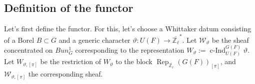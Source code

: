 \documentclass{article}
\newcommand{\red}[1]{\textcolor{red}{#1}}
\newtheorem*{remark}{Remark}
\newtheorem{proposition}{Proposition}
\DeclareMathOperator{\cInd}{\operatorname{c-Ind}}
\newcommand{\Rep}{\operatorname{Rep}}
\newcommand{\Perf}{\operatorname{Perf}}
\begin{document}
%
%
%

%
%

\subsection{Definition of the functor}

Let's first define the functor. For this, let's choose a Whittaker datum consisting of a Borel $B \subset G$ and a generic character $\vartheta: U(F) \to \overline{\mathbb{Z}_{\ell}}^*$. Let $\mathcal{W}_{\vartheta}$ be the sheaf concentrated on $Bun_G^1$ corresponding to the representation $W_{\vartheta}:=\cInd_{U(F)}^{G(F)}\vartheta$. Let $W_{\vartheta, [\pi]}$ be the restriction of $W_{\vartheta}$ to the block $\Rep_{\overline{\mathbb{Z}_{\ell}}}(G(F))_{[\pi]}$, and $\mathcal{W}_{\vartheta, [\pi]}$ the corresponding sheaf.
\end{document}
